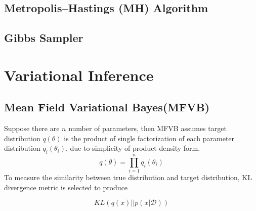\subsection{Metropolis–Hastings (MH) Algorithm}
\subsection{Gibbs Sampler}

\section{Variational Inference}
\label{VI}

\subsection{Mean Field Variational Bayes(MFVB)}
Suppose there are $n$ number of parameters, then MFVB assumes target distribution $q(\theta)$ is the product of single factorization of each parameter distribution $q_i(\theta_i)$, due to simplicity of product density form. 
\begin{equation}
	q(\theta) = \prod_{i=1}^{n} q_i(\theta_i)
\end{equation}
To measure the similarity between true distribution and target distribution, KL divergence metric is selected to produce

\begin{equation}
	KL(q(x)||p(x|\mathcal{D})) 
\end{equation}







